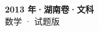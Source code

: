 \documentclass[zihao=-4, a4paper]{ctexart}
\begin{document}
\begin{center}
  {\Large\bfseries 2013 年·湖南卷·文科}\\[4pt]
  {\large 数学 · 试题版}
\end{center}
\medskip
{}

\end{document}
